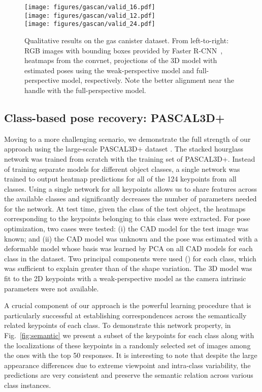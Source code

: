 \documentclass[letterpaper, 10 pt, conference]{ieeeconf}
\begin{document}
\begin{figure*}{}
  \centering
  \texttt{[image: figures/gascan/valid\_16.pdf]}\\
  \texttt{[image: figures/gascan/valid\_12.pdf]}\\
  \texttt{[image: figures/gascan/valid\_24.pdf]}\\
  \caption{Qualitative results on the gas canister dataset. From left-to-right: RGB images with bounding boxes provided by Faster R-CNN~\cite{ren2015faster}, heatmaps from the convnet, projections of the 3D model with estimated poses using the weak-perspective model and full-perspective model, respectively. Note the better alignment near the handle with the full-perspective model.}\label{fig:gascan}
\end{figure*}

\subsection{Class-based pose recovery: PASCAL3D+}\label{sec:pascal}

Moving to a more challenging scenario, we demonstrate the full strength of our approach using the large-scale PASCAL3D+ dataset \cite{xiang2014}. The stacked hourglass network was trained from scratch with the training set of PASCAL3D+. Instead of training separate models for different object classes, a single network was trained to output heatmap predictions for all of the 124 keypoints from all classes. Using a single network for all keypoints allows us to share features across the available classes and significantly decreases the number of parameters needed for the network. At test time, given the class of the test object, the heatmaps corresponding to the keypoints belonging to this class were extracted. For pose optimization, two cases were tested: (i) the CAD model for the test image was known; and (ii) the CAD model was unknown and the pose was estimated with a deformable model whose basis was learned by PCA on all CAD models for each class in the dataset. Two principal components were used () for each class, which was sufficient to explain greater than  of the shape variation. The 3D model was fit to the 2D keypoints with a weak-perspective model as the camera intrinsic parameters were not available. 

\vspace{5pt} A crucial component of our approach is the powerful learning procedure that is particularly successful at establishing correspondences across the semantically related keypoints of each class. To demonstrate this network property,  in Fig.~\ref{fig:semantic} we present a subset of the keypoints for each class along with the localizations of these keypoints in a randomly selected set of images among the ones with the top 50 responses. It is interesting to note that despite the large appearance differences due to extreme viewpoint and intra-class variability, the predictions are very consistent and preserve the semantic relation across various class instances.
\end{document}
